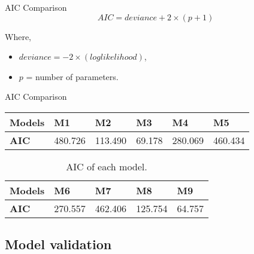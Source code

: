\documentclass[unknownkeysallowed]{beamer}
\begin{document}
\begin{frame}{AIC Comparison}
{\[AIC = deviance + 2\times (p+1)\]}
\medskip

Where, 
\begin{itemize}
    \item $deviance = - 2 \times (loglikelihood)$,
    \item $p$ = number of parameters.
\end{itemize}

\end{frame}

\begin{frame}{AIC Comparison}

\begin{table}[h!]
   \centering
    \begin{tabular}{ |p{1.5cm}||p{1.5cm}|p{1.5cm}|p{1cm}|p{1.5cm}|p{1.5cm}|}
    \hline
    \textbf{Models} & M1 & M2 & M3 & M4 & M5 \\
    \hline
     \textbf{AIC} & 480.726 & 113.490 & 69.178 & 280.069 & 460.434 \\ 
     \hline
    \end{tabular}
    \label{Tableau AIC}
\end{table}

\begin{table}[h!]
   \centering
    \begin{tabular}{ |p{1.5cm}||p{1.5cm}|p{1.5cm}|p{1.5cm}|p{1cm}|}
    \hline
    \textbf{Models} & M6 & M7 & M8 & M9\\
    \hline
     \textbf{AIC} & 270.557 & 462.406 & 125.754 & 64.757\\ 
     \hline
    \end{tabular}
    \caption{AIC of each model.}
    \label{Tableau AIC}
\end{table}

\end{frame}

\subsection{Model validation}
\label{sub:model validation}
\end{document}
